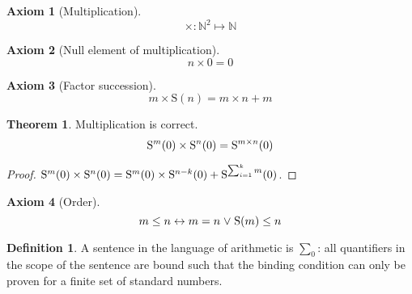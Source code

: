 \documentclass{amsbook}
\newcommand{\eqv}{\mathrel\leftrightarrow}
\newcommand{\disj}{\mathrel\vee}
\theoremstyle{definition}
\newtheorem{axm}{Axiom}[chapter]
\newtheorem{thm}{Theorem}[section]
\newtheorem{dfn}{Definition}[section]
\begin{document}
\begin{axm}[Multiplication]
    $$\times: \mathbb N^2 \longmapsto \mathbb N$$
\end{axm}

\begin{axm}[Null element of multiplication]
    $$n \times 0 = 0$$
\end{axm}

\begin{axm}[Factor succession]
    $$m \times \mathrm S(n) = m \times n + m$$
\end{axm}

\begin{thm}
    Multiplication is correct.
    $$\mathrm S^m(0) \times \mathrm S^n(0) = \mathrm S^{m \times n}(0)$$
    \begin{proof}
        $\mathrm S^m(0) \times \mathrm S^n(0) = \mathrm S^m(0) \times \mathrm S^{n-k}(0) + \mathrm S^{\sum_{i=1}^{k} m}(0)$.
    \end{proof}
\end{thm}

\begin{axm}[Order]
    $$m \leq n \eqv m = n \disj \suc(m) \leq n$$
\end{axm}

\newcommand{\power}{\mathrel\mathrm{power}}
\newcommand{\fuck}{\mathrel\mathrm{starts}}
\newcommand{\cunt}{\mathrel\mathrm{ends}}
\newcommand{\subs}{\mathrel\mathrm{subs}}
\newcommand{\monos}{\mathrel\mathrm{monos}}
\newcommand{\const}{\mathrm{const}}

\newcommand{\ord}[1]{\ulcorner#1\urcorner}
\newcommand{\pred}{\mathrm{pred}}
\newcommand{\preseq}{\mathrel\mathrm{preseq}}
\newcommand{\inseq}{\mathrel\mathrm{inseq}}
\newcommand{\prim}{\mathrm{prime}}
\newcommand{\divs}{\mathrel|}

\begin{dfn}
    A sentence in the language of arithmetic is $\sum_0$: all quantifiers in the scope of the sentence are bound such that the binding condition can only be proven for a finite set of standard numbers.
\end{dfn}
\end{document}
